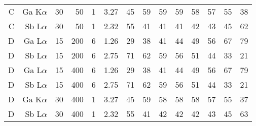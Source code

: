 \begin{table}[phtb]
\begin{center}
\begin{tabular}{rrrrrrrrrrrrrr}
            C            & Ga K$\alpha$  & 30             & 50             & 1           & 3.27              & 45                 & 59           & 59            & 59             & 58             & 57             & 55            & 38             \\
            C            & Sb L$\alpha$  & 30             & 50             & 1           & 2.32              & 55                 & 41           & 41            & 41             & 42             & 43             & 45            & 62             \\
            \hline
            D            & Ga L$\alpha$  & 15             & 200            & 6           & 1.26              & 29                 & 38           & 41            & 44             & 49             & 56             & 67            & 79             \\
            D            & Sb L$\alpha$  & 15             & 200            & 6           & 2.75              & 71                 & 62           & 59            & 56             & 51             & 44             & 33            & 21             \\
            D            & Ga L$\alpha$  & 15             & 400            & 6           & 1.26              & 29                 & 38           & 41            & 44             & 49             & 56             & 67            & 79             \\
            D            & Sb L$\alpha$  & 15             & 400            & 6           & 2.75              & 71                 & 62           & 59            & 56             & 51             & 44             & 33            & 21             \\
            D            & Ga K$\alpha$  & 30             & 400            & 1           & 3.27              & 45                 & 59           & 58            & 58             & 58             & 57             & 55            & 37             \\
            D            & Sb L$\alpha$  & 30             & 400            & 1           & 2.32              & 55                 & 41           & 42            & 42             & 42             & 43             & 45            & 63             \\
            \hline
        \end{tabular}
    \end{center}
\end{table}
\restoregeometry %

